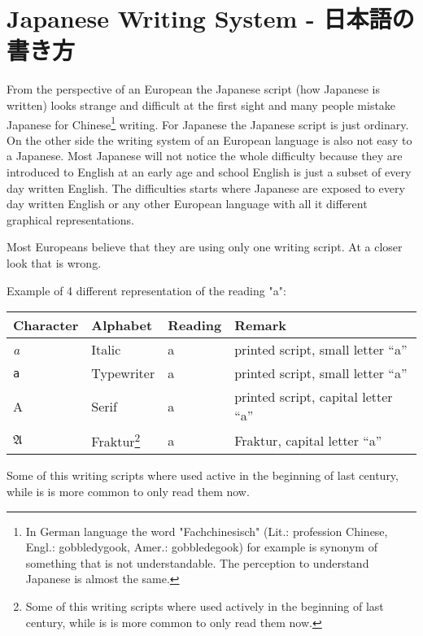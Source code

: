 \chapter{Japanese Writing System - 日本語の書き方}\label{chap:JapaneseWritingSystem}

From the perspective of an European the Japanese script (how Japanese is
written) looks strange and difficult at the first sight and many people mistake
Japanese for Chinese\footnote{In German language the word "Fachchinesisch"
(Lit.: profession Chinese, Engl.: gobbledygook, Amer.: gobbledegook) for
example is synonym of something that is not understandable. The perception to
understand Japanese is almost the same.} writing. For Japanese the Japanese
script is just ordinary. On the other side the writing system of an European
language is also not easy to a Japanese. Most Japanese will not notice the
whole difficulty because they are introduced to English at an early age and
school English is just a subset of every day written English. The difficulties
starts where Japanese are exposed to every day written English or any other
European language with all it different graphical representations.

Most Europeans believe that they are using only one writing script. At a closer
look that is wrong.

\bigskip Example of 4 different representation of the reading "a":

\begin{center}
\begin{tabular}{|l|l|l|l|}
\textbf{Character}&\textbf{Alphabet}&\textbf{Reading}&\textbf{Remark}\\\hline
\textit{a}     &  Italic        & a & printed script, small letter ``a'' \\ 
\texttt{a}     &  Typewriter    & a & printed script, small letter ``a'' \\ 
A              &  Serif         & a & printed script, capital letter ``a'' \\ 
$\mathfrak{A}$ & Fraktur\footnote{Some of this writing scripts where used 
actively in the beginning of last century, while is is more common to only 
read them now.}& a & Fraktur, capital letter ``a''  \\ 
\end{tabular}
\end{center}

Some of this writing scripts where used active in the beginning of last
century, while is is more common to only read them now. 

